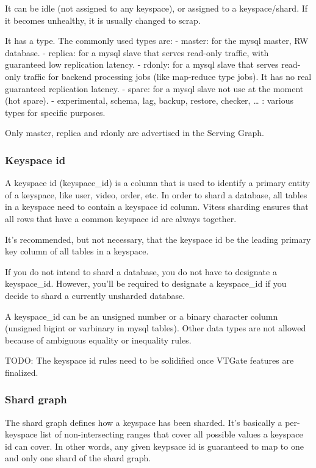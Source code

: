 It can be idle (not assigned to any keyspace), or assigned to a keyspace/shard. If it becomes unhealthy, it is usually changed to scrap.

It has a type. The commonly used types are:
- master: for the mysql master, RW database.
- replica: for a mysql slave that serves read-only traffic, with guaranteed low replication latency.
- rdonly: for a mysql slave that serves read-only traffic for backend processing jobs (like map-reduce type jobs). It has no real guaranteed replication latency.
- spare: for a mysql slave not use at the moment (hot spare).
- experimental, schema, lag, backup, restore, checker, \ldots{} : various types for specific purposes.

Only master, replica and rdonly are advertised in the Serving Graph.

\subsubsection{Keyspace id}\hypertarget{keyspace-id}{}\label{keyspace-id}

A keyspace id (keyspace\_id) is a column that is used to identify a primary entity
of a keyspace, like user, video, order, etc.
In order to shard a database, all tables in a keyspace need to
contain a keyspace id column.
Vitess sharding ensures that all rows that have a common keyspace id are
always together.

It's recommended, but not necessary, that the keyspace id be the leading primary
key column of all tables in a keyspace.

If you do not intend to shard a database, you do not have to
designate a keyspace\_id.
However, you'll be required to designate a keyspace\_id
if you decide to shard a currently unsharded database.

A keyspace\_id can be an unsigned number or a binary character column (unsigned bigint
or varbinary in mysql tables). Other data types are not allowed because of ambiguous
equality or inequality rules.

TODO: The keyspace id rules need to be solidified once VTGate features are finalized.

\subsubsection{Shard graph}\hypertarget{shard-graph}{}\label{shard-graph}

The shard graph defines how a keyspace has been sharded. It's basically a per-keyspace
list of non-intersecting ranges that cover all possible values a keyspace id can cover.
In other words, any given keypsace id is guaranteed to map to one and only one
shard of the shard graph.

